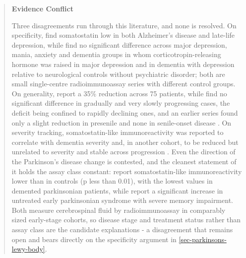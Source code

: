 \documentclass[11pt]{article}
\begin{document}
\begin{quote}
\noindent\textbf{Evidence Conflict}\par
Three disagreements run through this literature, and none is resolved. On specificity, \citet{Sunderland1987} find somatostatin low in both Alzheimer's disease and late-life depression, while \citet{Banki1992} find no significant difference across major depression, mania, anxiety and dementia groups in whom corticotropin-releasing hormone was raised in major depression and in dementia with depression relative to neurological controls without psychiatric disorder; both are small single-centre radioimmunoassay series with different control groups. On generality, \citet{Reinikainen1987} report a 35\% reduction across 75 patients, while \citet{Urakami1989} find no significant difference in gradually and very slowly progressing cases, the deficit being confined to rapidly declining ones, and an earlier series found only a slight reduction in presenile and none in senile-onset disease \citep{Francis1984}. On severity tracking, somatostatin-like immunoreactivity was reported to correlate with dementia severity \citep{Soininen1984} and, in another cohort, to be reduced but unrelated to severity and stable across progression \citep{Atack1988}. Even the direction of the Parkinson's disease change is contested, and the cleanest statement of it holds the assay class constant: \citet{Jolkkonen1986} report somatostatin-like immunoreactivity lower than in controls (p less than 0.01), with the lowest values in demented parkinsonian patients, while \citet{Espino1995} report a significant increase in untreated early parkinsonian syndrome with severe memory impairment. Both measure cerebrospinal fluid by radioimmunoassay in comparably sized early-stage cohorts, so disease stage and treatment status rather than assay class are the candidate explanations - a disagreement that remains open and bears directly on the specificity argument in \ref{sec-parkinsons-lewy-body}.

\end{quote}
\end{document}
